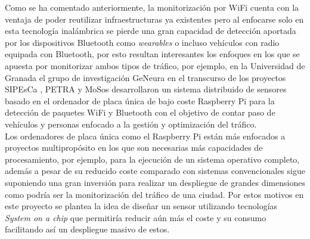 \documentclass[../proyecto.tex]{subfiles}
\begin{document}
Como se ha comentado anteriormente, la monitorización por WiFi cuenta con la ventaja de poder reutilizar infraestructuras ya existentes pero al enfocarse solo en esta tecnología inalámbrica se pierde una gran capacidad de detección aportada por los dispositivos Bluetooth como \textit{wearables} o incluso vehículos con radio equipada con Bluetooth, por esto resultan interesantes los enfoques en los que se apuesta por monitorizar ambos tipos de tráfico, por ejemplo, en la Universidad de Granada el grupo de investigación GeNeura en el transcurso de los proyectos SIPEsCa \cite{proyecto_sipesca}, PETRA \cite{proyecto_petra} y MoSos \cite{proyecto_mosos} desarrollaron un sistema distribuido de sensores basado en el ordenador de placa única de bajo coste Raspberry Pi para la detección de paquetes WiFi y Bluetooth con el objetivo de contar paso de vehículos y personas enfocado a la gestión y optimización del tráfico.\\

Los ordenadores de placa única como el Raspberry Pi están más enfocados a proyectos multipropósito en los que son necesarias más capacidades de procesamiento, por ejemplo, para la ejecución de un sistema operativo completo, además a pesar de su reducido coste comparado con sistemas convencionales sigue suponiendo una gran inversión para realizar un despliegue de grandes dimensiones como podría ser la monitorización del tráfico de una ciudad. Por estos motivos en este proyecto se plantea la idea de diseñar un sensor utilizando tecnologías  \textit{System on a chip} que permitiría reducir aún más el coste y su consumo facilitando así un despliegue masivo de estos.\\

\end{document}
